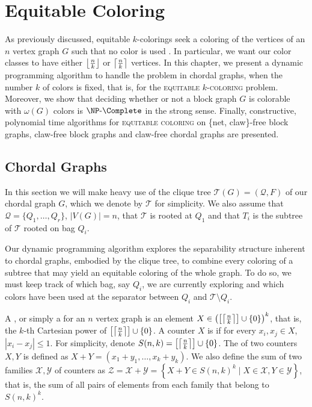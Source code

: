 \chapter{Equitable Coloring}
\label{ch:eq_coloring}

As previously discussed, equitable $k$-colorings seek a coloring of the vertices of an $n$ vertex graph $G$ such that no color is used . In particular, we want our color classes to have either $\left\lfloor\frac{n}{k}\right\rfloor$ or $\left\lceil\frac{n}{k}\right\rceil$ vertices.
In this chapter, we present a dynamic programming algorithm to handle the problem in chordal graphs, when the number $k$ of colors is fixed, that is, for the \textsc{equitable $k$-coloring} problem.
Moreover, we show that deciding whether or not a block graph $G$ is colorable with $\omega(G)$ colors is $\NPc$ in the strong sense.
Finally, constructive, polynomial time algorithms for \textsc{equitable coloring} on \{net, claw\}-free block graphs, claw-free block graphs and claw-free chordal graphs are presented.

\section{Chordal Graphs}

In this section we will make heavy use of the clique tree $\mathcal{T}(G) = (\mathcal{Q}, F)$ of our chordal graph $G$, which we denote by $\mathcal{T}$ for simplicity.
We also assume that $\mathcal{Q} = \{Q_1, \dots, Q_r\}$, $|V(G)| = n$, that $\mathcal{T}$ is rooted at $Q_1$ and that $T_i$ is the subtree of $\mathcal{T}$ rooted on bag $Q_i$.

Our dynamic programming algorithm explores the separability structure inherent to chordal graphs, embodied by the clique tree, to combine every coloring of a subtree that may yield an equitable coloring of the whole graph.
To do so, we must keep track of which bag, say $Q_i$, we are currently exploring and which colors have been used at the separator between $Q_i$ and $\mathcal{T} \setminus Q_i$.

A , or simply a  for an $n$ vertex graph is an element $X \in \left(\left[\left\lceil\frac{n}{k}\right\rceil\right] \cup \{0\}\right)^k$, that is, the $k$-th Cartesian power of $\left[\left\lceil\frac{n}{k}\right\rceil\right] \cup \{0\}$.
A counter $X$ is  if for every $x_i, x_j \in X$, $|x_i - x_j| \leq 1$.
For simplicity, denote $S(n,k) = \left[\left\lceil\frac{n}{k}\right\rceil\right] \cup \{0\}$.
The  of two counters $X,Y$ is defined as $X + Y = (x_1 + y_1, \dots, x_k + y_k)$.
We also define the sum of two families $\mathcal{X}, \mathcal{Y}$ of counters as $\mathcal{Z} = \mathcal{X} + \mathcal{Y} = \left\{X + Y \in S(n,k)^k \mid X \in \mathcal{X}, Y \in \mathcal{Y} \right\}$, that is, the sum of all pairs of elements from each family that belong to $S(n,k)^k$.

